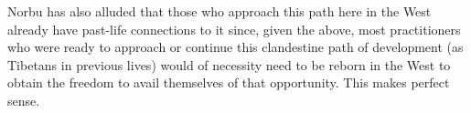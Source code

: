 \begin{footnotesize}
\begin{sffamily}
Norbu has also alluded that those who approach this path here in the West already have past-life connections to it since, given the above, most practitioners who were ready to approach or continue this clandestine path of development (as Tibetans in previous lives) would of necessity need to be reborn in the West to obtain the freedom to avail themselves of that opportunity. This makes perfect sense.

\end{sffamily}
\end{footnotesize}

